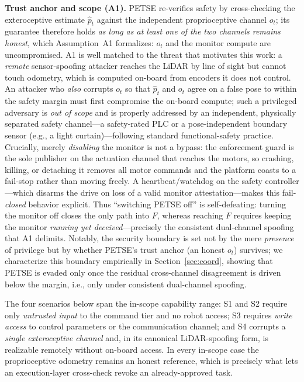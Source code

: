 \documentclass[journal,twoside,web]{ieeecolor}
\begin{document}
\textbf{Trust anchor and scope (A1).} PETSE re-verifies safety by
cross-checking the exteroceptive estimate $\hat{p}_t$ against the
independent proprioceptive channel $o_t$; its guarantee therefore holds
\emph{as long as at least one of the two channels remains honest}, which
Assumption~A1 formalizes: $o_t$ and the monitor compute are
uncompromised. A1 is well matched to the threat that motivates this
work: a \emph{remote} sensor-spoofing attacker reaches the LiDAR by line
of sight but cannot touch odometry, which is computed on-board from
encoders it does not control. An attacker who \emph{also} corrupts $o_t$
so that $\hat{p}_t$ and $o_t$ agree on a false pose to within the safety
margin must first compromise the on-board compute; such a privileged
adversary is \emph{out of scope} and is properly addressed by an
independent, physically separated safety channel---a safety-rated PLC or
a pose-independent boundary sensor (e.g., a light curtain)---following
standard functional-safety practice. Crucially, merely \emph{disabling}
the monitor is not a bypass: the enforcement guard is the sole publisher
on the actuation channel that reaches the motors, so crashing, killing, or
detaching it removes all motor commands and the platform coasts to a
fail-stop rather than moving freely. A heartbeat/watchdog on the safety
controller---which disarms the drive on loss of a valid monitor
attestation---makes this fail-\emph{closed} behavior explicit. Thus
``switching PETSE off'' is self-defeating: turning the monitor off closes
the only path into $F$, whereas reaching $F$ requires keeping the monitor
\emph{running yet deceived}---precisely the consistent dual-channel
spoofing that A1 delimits. Notably, the security boundary is
set not by the mere \emph{presence} of privilege but by whether PETSE's
trust anchor (an honest $o_t$) survives; we characterize this boundary
empirically in Section~\ref{sec:coord}, showing that PETSE is evaded only
once the residual cross-channel disagreement is driven below the margin,
i.e., only under consistent dual-channel spoofing.

The four scenarios below span the in-scope capability range: S1 and S2
require only \emph{untrusted input} to the command tier and no robot
access; S3 requires \emph{write access} to control parameters or the
communication channel; and S4 corrupts a \emph{single exteroceptive
channel} and, in its canonical LiDAR-spoofing form, is realizable
remotely without on-board access. In every in-scope case the
proprioceptive odometry remains an honest reference, which is precisely
what lets an execution-layer cross-check revoke an already-approved task.
\end{document}
